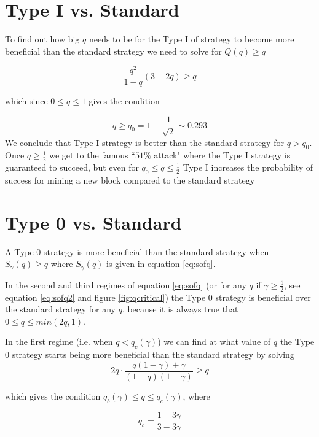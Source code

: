 \documentclass[letterpaper,12pt]{report}
\theoremstyle{plain}
\theoremstyle{definition}
\begin{document}
\section{Type I vs. Standard}\label{TypeIoverStandard}
To find out how big $q$ needs to be for the Type I of strategy to become more beneficial than the standard strategy we need to solve for $Q(q)\geq q$

\begin{equation}\label{eq:type1overstandard}
\dfrac{q^2}{1-q}\left(3-2q\right) \geq q
\end{equation}

which since $0\leq q \leq 1$ gives the condition 

\begin{equation}\label{eq:qnot}
q\geq q_0=1-\frac{1}{\sqrt{2}} \sim 0.293
\end{equation}
We conclude that Type I strategy is better than the standard strategy for $q>q_0$. Once $q\geq \frac{1}{2}$ we get to the famous ``$51\%$ attack" where the Type I strategy is guaranteed to succeed, but even for $q_0\leq q \leq \frac{1}{2}$ Type I increases the probability of success for mining a new block compared to the standard strategy

\section{Type 0 vs. Standard}\label{Type0overStandard}

A Type 0 strategy is more beneficial than the standard strategy when $S_\gamma(q)\geq q$ where $S_\gamma(q)$ is given in equation \ref{eq:sofq}. 

In the second and third regimes of equation \ref{eq:sofq} (or for any $q$ if $\gamma\geq\frac{1}{2}$, see equation \ref{eq:sofq2} and figure \ref{fig:qcritical}) the Type 0 strategy is beneficial over the standard strategy for any $q$, because it is always true that $0\leq q \leq min(2q,1)$. 

In the first regime (i.e. when $q<q_c(\gamma)$) we can find at what value of $q$ the Type 0 strategy starts being more beneficial than the standard strategy by solving
\begin{equation}\label{eq:type0benefitonhonestequation}
2q\cdot\frac{q(1-\gamma)+\gamma}{(1-q)(1-\gamma)}\geq q
\end{equation}

which gives the condition $q_b(\gamma)\leq q \leq q_c(\gamma)$, where 

\begin{equation}\label{eq:qb}
q_b= \dfrac{1-3\gamma}{3-3\gamma}
\end{equation}
\end{document}
